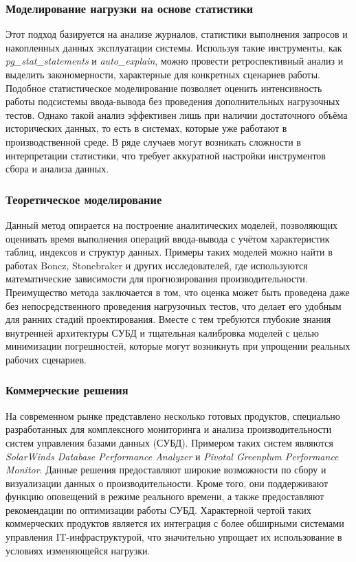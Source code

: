 \subsubsection{Моделирование нагрузки на основе статистики}
Этот подход базируется на анализе журналов, статистики выполнения запросов и накопленных данных эксплуатации системы. Используя такие инструменты, как \textit{pg\_stat\_statements} и \textit{auto\_explain}, можно провести ретроспективный анализ и выделить закономерности, характерные для конкретных сценариев работы. Подобное статистическое моделирование позволяет оценить интенсивность работы подсистемы ввода-вывода без проведения дополнительных нагрузочных тестов. Однако такой анализ эффективен лишь при наличии достаточного объёма исторических данных, то есть в системах, которые уже работают в производственной среде. В ряде случаев могут возникать сложности в интерпретации статистики, что требует аккуратной настройки инструментов сбора и анализа данных.

\subsubsection{Теоретическое моделирование}
Данный метод опирается на построение аналитических моделей, позволяющих оценивать время выполнения операций ввода-вывода с учётом характеристик таблиц, индексов и структур данных. Примеры таких моделей можно найти в работах Boncz, Stonebraker и других исследователей, где используются математические зависимости для прогнозирования производительности. Преимущество метода заключается в том, что оценка может быть проведена даже без непосредственного проведения нагрузочных тестов, что делает его удобным для ранних стадий проектирования. Вместе с тем требуются глубокие знания внутренней архитектуры СУБД и тщательная калибровка моделей с целью минимизации погрешностей, которые могут возникнуть при упрощении реальных рабочих сценариев.

\subsubsection{Коммерческие решения}
На современном рынке представлено несколько готовых продуктов, специально разработанных для комплексного мониторинга и анализа производительности систем управления базами данных (СУБД). Примером таких систем являются \textit{SolarWinds Database Performance Analyzer} и \textit{Pivotal Greenplum Performance Monitor}. Данные решения предоставляют широкие возможности по сбору и визуализации данных о производительности. Кроме того, они поддерживают функцию оповещений в режиме реального времени, а также предоставляют рекомендации по оптимизации работы СУБД. Характерной чертой таких коммерческих продуктов является их интеграция с более обширными системами управления IT-инфраструктурой, что значительно упрощает их использование в условиях изменяющейся нагрузки.

